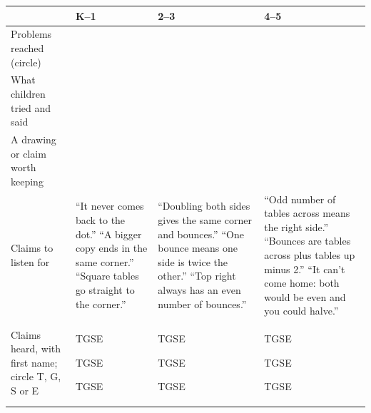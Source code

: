 \documentclass[11pt,letterpaper]{article}
\begin{document}
\medskip
\newcommand{\st}{\par\hfill{\footnotesize T\quad G\quad S\quad E}\par\vspace{24pt}}
\newcommand{\gap}[1]{\rule[-#1]{0pt}{#1}}
{\small
\renewcommand{\arraystretch}{1.15}
\begin{tabularx}{\linewidth}{@{}>{\raggedright\arraybackslash}p{0.95in}|>{\raggedright\arraybackslash}X|>{\raggedright\arraybackslash}X|>{\raggedright\arraybackslash}X@{}}
\toprule
 & \textbf{K--1} & \textbf{2--3} & \textbf{4--5}\\
\midrule
Problems reached (circle) & 1\enspace 2\enspace 3\enspace 4\enspace 5\enspace 6\enspace 7 & 1\enspace 2\enspace 3\enspace 4\enspace 5\enspace 6\enspace 7\enspace 8 & 1\enspace 2\enspace 3\enspace 4\enspace 5\enspace 6\enspace 7\enspace 8\\
\midrule
What children tried and said & & & \gap{1.25in}\\
\midrule
A drawing or claim worth keeping & & & \gap{1.05in}\\
\midrule
Claims to listen for & {\footnotesize ``It never comes back to the dot.'' ``A bigger copy ends in the same corner.'' ``Square tables go straight to the corner.''} & {\footnotesize ``Doubling both sides gives the same corner and bounces.'' ``One bounce means one side is twice the other.'' ``Top right always has an even number of bounces.''} & {\footnotesize ``Odd number of tables across means the right side.'' ``Bounces are tables across plus tables up minus 2.'' ``It can't come home: both would be even and you could halve.''}\\
\midrule
Claims heard, with first name; circle T, G, S or E & \st\st\st & \st\st\st & \st\st\st\\
\bottomrule
\end{tabularx}}
\end{document}
